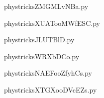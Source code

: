 
    \newcommand{\CaptionFigZMGMLvNBa}{<+Type your caption here+>}
    \begin{center}
        
    \end{center}
    phystricksZMGMLvNBa.py

    

    \clearpage
    


    \newcommand{\CaptionFigXUATooMWfESC}{<+Type your caption here+>}
    \begin{center}
        
    \end{center}
    phystricksXUATooMWfESC.py

    

    \clearpage
    


    \newcommand{\CaptionFigJLUTBlD}{<+Type your caption here+>}
    \begin{center}
        
    \end{center}
    phystricksJLUTBlD.py

    

    \clearpage
    


    \newcommand{\CaptionFigWRXbDCo}{<+Type your caption here+>}
    \begin{center}
        
    \end{center}
    phystricksWRXbDCo.py

    

    \clearpage
    


    \newcommand{\CaptionFigNAEFooZfyhCs}{<+Type your caption here+>}
    \begin{center}
        
    \end{center}
    phystricksNAEFooZfyhCs.py

    

    \clearpage
    


    \newcommand{\CaptionFigXTGXooDVcEZs}{<+Type your caption here+>}
    \begin{center}
        
    \end{center}
    phystricksXTGXooDVcEZs.py

